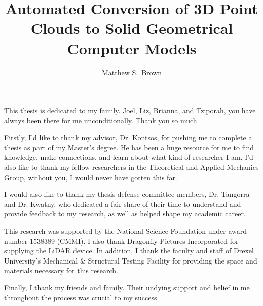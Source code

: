 \documentclass[12pt]{drexelthesis}
\title{Automated Conversion of 3D Point Clouds to Solid Geometrical Computer Models}
\author{Matthew S.~Brown}
\begin{document}
\maketitle
\begin{preliminary}

\newpage

\setcounter{page}{2}

\date{} %

\begin{dedication}
This thesis is dedicated to my family. Joel, Liz, Brianna, and Tziporah, you have always been there for me unconditionally. Thank you so much.

\end{dedication}

\begin{acknowledgements}
	Firstly, I'd like to thank my advisor, Dr. Kontsos, for pushing me to complete a thesis as part of my Master's degree. He has been a huge resource for me to find knowledge, make connections, and learn about what kind of researcher I am. I'd also like to thank my fellow researchers in the Theoretical and Applied Mechanics Group, without you, I would never have gotten this far.

	I would also like to thank my thesis defense committee members, Dr. Tangorra and Dr. Kwatny, who dedicated a fair share of their time to understand and provide feedback to my research, as well as helped shape my academic career.

	This research was supported by the National Science Foundation under award number 1538389 (CMMI). I also thank Dragonfly Pictures Incorporated for supplying the LiDAR device. In addition, I thank the faculty and staff of Drexel University’s Mechanical & Structural Testing Facility for providing the space and materials necessary for this research.

	Finally, I thank my friends and family. Their undying support and belief in me throughout the process was crucial to my success.

\end{acknowledgements}



\end{preliminary}
\end{document}
